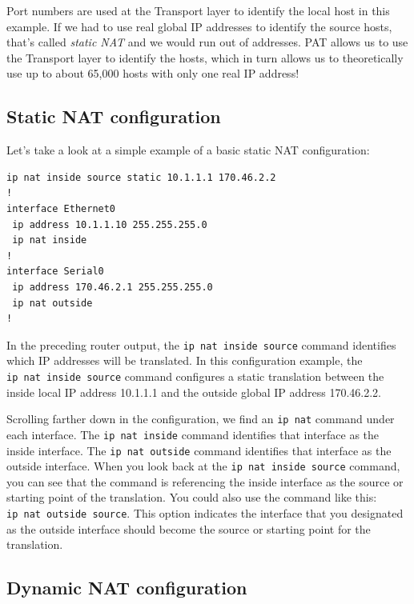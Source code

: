 \documentclass[b5paper,11pt]{memoir}
\begin{document}
Port numbers are used at the Transport layer to identify the local host
in this example. If we had to use real global IP addresses to identify
the source hosts, that's called \emph{static NAT}
and we would run out
of addresses. PAT allows us to use the Transport layer to identify the
hosts, which in turn allows us to theoretically use up to about 65,000
hosts with only one real IP address!



\subsection{Static NAT configuration}

Let's take a look at a simple example of a basic static NAT
configuration:

\begin{verbatim}
ip nat inside source static 10.1.1.1 170.46.2.2
!
interface Ethernet0
 ip address 10.1.1.10 255.255.255.0
 ip nat inside
!
interface Serial0
 ip address 170.46.2.1 255.255.255.0
 ip nat outside
!
\end{verbatim}

In the preceding router output, the \texttt{ip\ nat\ inside\ source}
command identifies which IP addresses will be translated. In this
configuration example, the \texttt{ip\ nat\ inside\ source} command
configures a static translation between the inside local IP address
10.1.1.1 and the outside global IP address 170.46.2.2.

Scrolling farther down in the configuration, we find an \texttt{ip\ nat}
command under each interface. The \texttt{ip\ nat\ inside} command
identifies that interface as the inside interface. The
\texttt{ip\ nat\ outside} command identifies that interface as the
outside interface. When you look back at the
\texttt{ip\ nat\ inside\ source} command, you can see that the command
is referencing the inside interface as the source or starting point of
the translation. You could also use the command like this:
\texttt{ip\ nat\ outside\ source}. This option indicates the interface
that you designated as the outside interface should become the source or
starting point for the translation.





\subsection{Dynamic NAT configuration}
\end{document}
